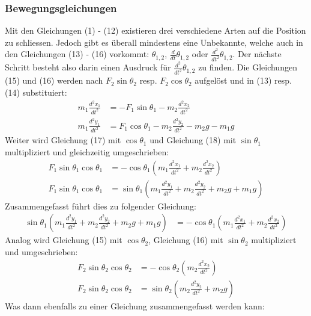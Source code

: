 \documentclass[titlepage, 11pt, a4paper, ngerman]{article}
\begin{document}
\subsubsection{Bewegungsgleichungen}
Mit den Gleichungen (1) - (12) existieren drei verschiedene Arten auf die Position zu schliessen. Jedoch gibt es überall mindestens eine Unbekannte, welche auch in den Gleichungen (13) - (16) vorkommt: $\theta_{1, 2}$, $\frac{d}{dt}\theta_{1, 2}$ oder $\frac{d^{2}}{dt^{2}}\theta_{1, 2}$. Der nächste Schritt besteht also darin einen Ausdruck für $\frac{d^{2}}{dt^{2}}\theta_{1, 2}$ zu finden.\bigbreak
Die Gleichungen (15) und (16) werden nach $F_{2} \sin{\theta_{2}}$ resp. $F_{2} \cos{\theta_{2}}$ aufgelöst und in (13) resp. (14) substituiert:
\begin{align}
    m_{1} \frac{d^{2}x_{1}}{dt^{2}} &= -F_{1} \sin{\theta_{1}} - m_{2} \frac{d^{2}x_{2}}{dt^{2}} \\
    m_{1} \frac{d^{2}y_{1}}{dt^{2}} &= F_{1} \cos{\theta_{1}} - m_{2} \frac{d^{2}y_{2}}{dt^{2}} - m_{2}g - m_{1}g
\end{align}
\bigbreak
Weiter wird Gleichung (17) mit $\cos{\theta_{1}}$ und Gleichung (18) mit $\sin{\theta_{1}}$ multipliziert und gleichzeitig umgeschrieben:
\begin{align}
    F_{1} \sin{\theta_{1}} \cos{\theta_{1}} &= - \cos{\theta_{1}} (m_{1} \frac{d^{2}x_{1}}{dt^{2}} + m_{2} \frac{d^{2}x_{2}}{dt^{2}}) \\
    F_{1} \sin{\theta_{1}} \cos{\theta_{1}} &= \sin{\theta_{1}} (m_{1} \frac{d^{2}y_{1}}{dt^{2}} + m_{2} \frac{d^{2}y_{2}}{dt^{2}} + m_{2}g + m_{1}g)
\end{align}
\bigbreak
Zusammengefasst führt dies zu folgender Gleichung:
\begin{align}
    \sin{\theta_{1}} (m_{1} \frac{d^{2}y_{1}}{dt^{2}} + m_{2} \frac{d^{2}y_{2}}{dt^{2}} + m_{2}g + m_{1}g) &= - \cos{\theta_{1}} (m_{1} \frac{d^{2}x_{1}}{dt^{2}} + m_{2} \frac{d^{2}x_{2}}{dt^{2}})
\end{align}
\bigbreak
Analog wird Gleichung (15) mit $\cos{\theta_{2}}$, Gleichung (16) mit $\sin{\theta_{2}}$ multipliziert und umgeschrieben:
\begin{align}
    F_{2} \sin{\theta_{2}} \cos{\theta_{2}} &= - \cos{\theta_{2}} (m_{2} \frac{d^{2}x_{2}}{dt^{2}}) \\
    F_{2} \sin{\theta_{2}} \cos{\theta_{2}} &= \sin{\theta_{2}} (m_{2} \frac{d^{2}y_{2}}{dt^{2}} + m_{2}g)
\end{align}
\bigbreak
Was dann ebenfalls zu einer Gleichung zusammengefasst werden kann:
\end{document}
